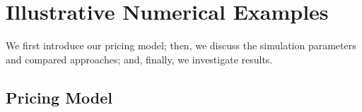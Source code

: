 \documentclass[journal]{IEEEtran}
\begin{document}


\section{Illustrative Numerical Examples} \label{sec:results}

We first introduce our pricing model; then, we discuss the simulation parameters and compared approaches; and, finally, we investigate results.

\subsection{Pricing Model}


\end{document}
